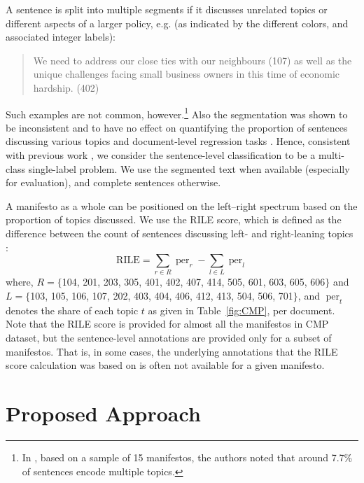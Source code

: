 \documentclass[11pt,a4paper]{article}
\DeclareMathOperator{\per}{per}
\newcommand{\tabref}[2][]{Table#1~\ref{#2}\xspace}
\begin{document}
A sentence is split into multiple segments if it discusses unrelated topics or different aspects of a larger policy, e.g. (as indicated by the different colors, and associated integer labels):
\begin{quote}
\color{red}
We need to address our close ties with our neighbours (107) \color{blue} as well as the unique challenges facing small business owners in this time of economic hardship. (402)
\end{quote}
Such examples are not common, however.\footnote{In , based on a sample of 15 manifestos, the authors noted that around 7.7\% of sentences encode multiple topics.} Also the segmentation was shown to be inconsistent and to have no effect on quantifying the proportion of sentences discussing various topics and document-level regression tasks \cite{daubler2012natural}. Hence, consistent with previous work \cite{biessmann2016automating, W17-2906}, we consider the sentence-level classification to be a multi-class single-label problem. We use the segmented text when available (especially for evaluation), and complete sentences otherwise.

A manifesto as a whole can be positioned on the left--right spectrum based on the proportion of topics discussed. We use the RILE score, which is defined as the difference between the count of sentences discussing left- and right-leaning topics \cite{cat}:
\begin{equation}
\text{RILE} = \sum_{r \in R} \per_{r} - \sum_{l \in L} \per_{l}
\end{equation}
where, $R = \{$104, 201, 203, 305, 401, 402, 407, 414, 505, 601, 603, 605, 606$\}$ and $L = \{$103, 105, 106, 107, 202, 403, 404, 406, 412, 413, 504, 506, 701$\}$, and $\per_{t}$ denotes the share of each topic $t$ as given in \tabref{fig:CMP}, per document.  Note that the RILE score is provided for almost all the manifestos in CMP dataset, but the sentence-level annotations are provided only for a subset of manifestos. That is, in some cases, the underlying annotations that the RILE score calculation was based on is often not available for a given manifesto.



\section{Proposed Approach}
\end{document}
